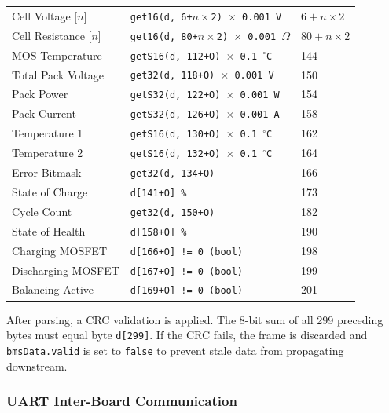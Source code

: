 \documentclass[12pt, a4paper]{report}
\begin{document}
{\begin{longtable}{L{4.2cm} L{5.2cm} C{2.5cm}}
Cell Voltage [$n$]     & \texttt{get16(d, 6+$n\times$2) $\times$ 0.001\,V}      & $6 + n\times 2$ \\
Cell Resistance [$n$]  & \texttt{get16(d, 80+$n\times$2) $\times$ 0.001\,$\Omega$} & $80 + n\times 2$ \\
MOS Temperature        & \texttt{getS16(d, 112+O) $\times$ 0.1\,$^{\circ}$C}    & 144 \\
Total Pack Voltage     & \texttt{get32(d, 118+O) $\times$ 0.001\,V}             & 150 \\
Pack Power             & \texttt{getS32(d, 122+O) $\times$ 0.001\,W}            & 154 \\
Pack Current           & \texttt{getS32(d, 126+O) $\times$ 0.001\,A}            & 158 \\
Temperature 1          & \texttt{getS16(d, 130+O) $\times$ 0.1\,$^{\circ}$C}    & 162 \\
Temperature 2          & \texttt{getS16(d, 132+O) $\times$ 0.1\,$^{\circ}$C}    & 164 \\
Error Bitmask          & \texttt{get32(d, 134+O)}                                & 166 \\
State of Charge        & \texttt{d[141+O]\,\%}                                   & 173 \\
Cycle Count            & \texttt{get32(d, 150+O)}                                & 182 \\
State of Health        & \texttt{d[158+O]\,\%}                                   & 190 \\
Charging MOSFET        & \texttt{d[166+O] != 0 (bool)}                           & 198 \\
Discharging MOSFET     & \texttt{d[167+O] != 0 (bool)}                           & 199 \\
Balancing Active       & \texttt{d[169+O] != 0 (bool)}                           & 201 \\

\end{longtable}

After parsing, a CRC validation is applied. The 8-bit sum of all 299 preceding
bytes must equal byte \texttt{d[299]}. If the CRC fails, the frame is discarded
and \texttt{bmsData.valid} is set to \texttt{false} to prevent stale data from
propagating downstream.

\subsubsection{UART Inter-Board Communication}

}
\end{document}
